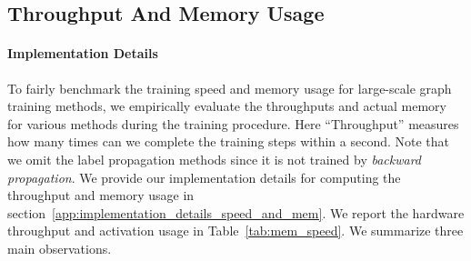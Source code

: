\message{ !name(main.tex)}\documentclass{article}
\begin{document}
\vspace{-2mm}
\subsection{Throughput And Memory Usage}
\paragraph{Implementation Details}
To fairly benchmark the training speed and memory usage for large-scale graph training methods, we empirically evaluate the throughputs and actual memory for various methods during the training procedure.
Here ``Throughput'' measures how many times can we complete the training steps within a second.
Note that we omit the label propagation methods since it is not trained by \textit{backward propagation}. We provide our implementation details for computing the throughput and memory usage in section~\ref{app:implementation_details_speed_and_mem}. We report the hardware throughput and activation usage in Table~\ref{tab:mem_speed}. We summarize three main observations.
\end{document}
